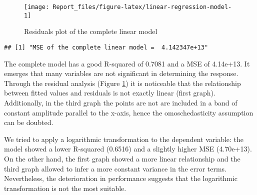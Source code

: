 \documentclass[
]{article}
\begin{document}
\begin{figure}

{\centering \texttt{[image: Report\_files/figure-latex/linear-regression-model-1]} 

}

\caption{Residuals plot of the complete linear model \label{fig:linear-regression-model}}\label{fig:linear-regression-model}
\end{figure}

\begin{verbatim}
## [1] "MSE of the complete linear model =  4.142347e+13"
\end{verbatim}

The complete model has a good R-squared of 0.7081 and a MSE of 4.14e+13.
It emerges that many variables are not significant in determining the
response. Through the residual analysis (Figure
\ref{fig:linear-regression-model}) it is noticeable that the
relationship between fitted values and residuals is not exactly linear
(first graph). Additionally, in the third graph the points are not are
included in a band of constant amplitude parallel to the x-axis, hence
the omoschedasticity assumption can be doubted.

We tried to apply a logarithmic transformation to the dependent
variable: the model showed a lower R-squared (0.6516) and a slightly
higher MSE (4.70e+13). On the other hand, the first graph showed a more
linear relationship and the third graph allowed to infer a more constant
variance in the error terms. Nevertheless, the deterioration in
performance suggests that the logarithmic transformation is not the most
suitable.
\end{document}

